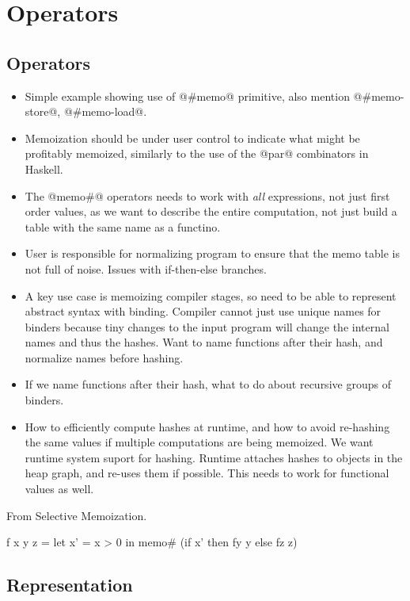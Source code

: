 \clearpage{}
\section{Operators}

\subsection{Operators}
\begin{itemize}
\item   Simple example showing use of @#memo@ primitive, also mention @#memo-store@, @#memo-load@.
\item   Memoization should be under user control to indicate what might be profitably memoized, similarly to the use of the @par@ combinators in Haskell.
\item   The @memo#@ operators needs to work with \emph{all} expressions, not just first order values, as we want to describe the entire computation, not just build a table with the same name as a functino.
\item   User is responsible for normalizing program to ensure that the memo table is not full of noise. Issues with if-then-else branches.
\item   A key use case is memoizing compiler stages, so need to be able to represent abstract syntax with binding. Compiler cannot just use unique names for binders because tiny changes to the input program will change the internal names and thus the hashes. Want to name functions after their hash, and normalize names before hashing.
\item   If we name functions after their hash, what to do about recursive groups of binders.
\item   How to efficiently compute hashes at runtime, and how to avoid re-hashing the same values if multiple computations are being memoized. We want runtime system suport for hashing. Runtime attaches hashes to objects in the heap graph, and re-uses them if possible. This needs to work for functional values as well.

\end{itemize}


From Selective Memoization.
\begin{code}
f x y z
 = let x' = x > 0 in
   memo# (if x' then fy y else fz z)
\end{code}



\subsection{Representation}

